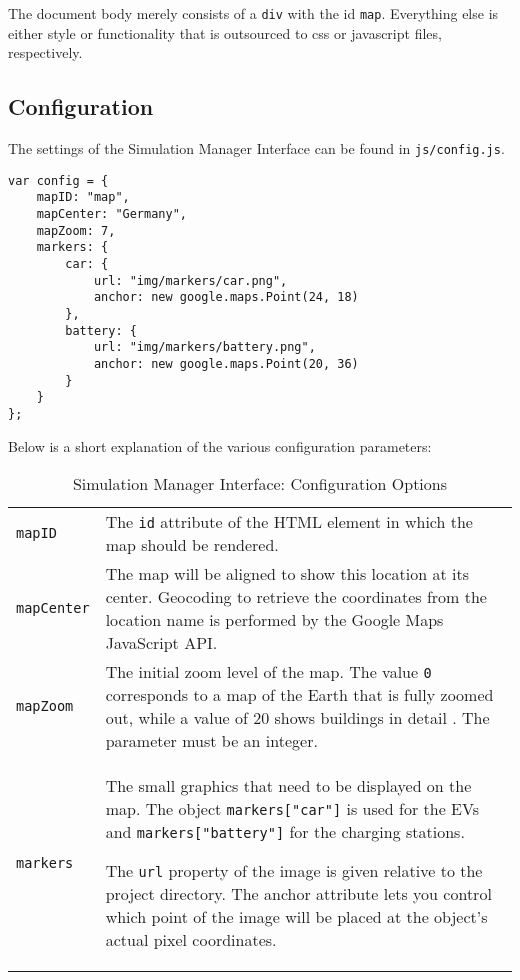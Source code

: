 The document body merely consists of a \texttt{div} with the id \texttt{map}. Everything else is either style or functionality that is outsourced to css or javascript files, respectively.

\subsection{Configuration}

The settings of the Simulation Manager Interface can be found in \texttt{js/config.js}.

\begin{verbatim}
var config = {
    mapID: "map",
    mapCenter: "Germany",
    mapZoom: 7,
    markers: {
        car: {
            url: "img/markers/car.png",
            anchor: new google.maps.Point(24, 18)
        },
        battery: {
            url: "img/markers/battery.png",
            anchor: new google.maps.Point(20, 36)
        }
    }
};
\end{verbatim}

Below is a short explanation of the various configuration parameters:

\begin{table}[htp]
\renewcommand{\arraystretch}{1.8}
\begin{tabular}{p{2.4cm}p{12cm}}
\texttt{mapID} & The \texttt{id} attribute of the HTML element in which the map should be rendered.\\
\texttt{mapCenter} &  The map will be aligned to show this location at its center. Geocoding to retrieve the coordinates from the location name is performed by the Google Maps JavaScript API.\\
\texttt{mapZoom} &  The initial zoom level of the map. The value \texttt{0} corresponds to a map of the Earth that is fully zoomed out, while a value of 20 shows buildings in detail \cite{google-api-zoom}. The parameter must be an integer.\\
\texttt{markers} & The small graphics that need to be displayed on the map. The object \texttt{markers["car"]} is used for the EVs and \texttt{markers["battery"]} for the charging stations.

The \texttt{url} property of the image is given relative to the project directory. The anchor attribute lets you control which point of the image will be placed at the object's actual pixel coordinates.
\end{tabular}
\vspace{4mm}
\caption{Simulation Manager Interface: Configuration Options}
\end{table}


